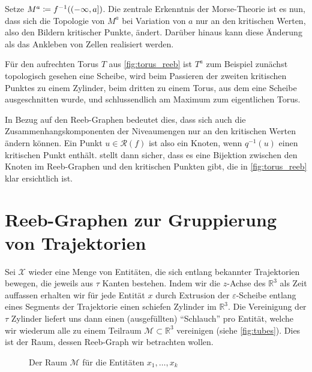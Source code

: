 Setze $M^a \coloneqq f^{-1}\enbrace*{(-\infty,a]}$.
Die zentrale Erkenntnis der Morse-Theorie ist es nun, dass sich die Topologie von $M^a$ bei Variation von $a$ nur an den kritischen Werten, also den Bildern kritischer Punkte, ändert.
Darüber hinaus kann diese Änderung als das Ankleben von Zellen realisiert werden.

Für den aufrechten Torus $T$ aus \cref{fig:torus_reeb} ist $T^a$ zum Beispiel zunächst topologisch gesehen eine Scheibe, wird beim Passieren der zweiten kritischen Punktes zu einem Zylinder, beim dritten zu einem Torus, aus dem eine Scheibe ausgeschnitten wurde, und schlussendlich am Maximum zum eigentlichen Torus.

In Bezug auf den Reeb-Graphen bedeutet dies, dass sich auch die Zusammenhangskomponenten der Niveaumengen nur an den kritischen Werten ändern können.
Ein Punkt $u \in \mathcal{R}(f)$ ist also ein Knoten, wenn $q^{-1}(u)$ einen kritischen Punkt enthält.
 stellt dann sicher, dass es eine Bijektion zwischen den Knoten im Reeb-Graphen und den kritischen Punkten gibt, die in \cref{fig:torus_reeb} klar ersichtlich ist.



\section{Reeb-Graphen zur Gruppierung von Trajektorien} %
\label{sec:trajek_reeb}
Sei $\mathcal{X}$ wieder eine Menge von Entitäten, die sich entlang bekannter Trajektorien bewegen, die jeweils aus $\tau$ Kanten bestehen.
Indem wir die $z$-Achse des $\mathbb{R}^3$ als Zeit auffassen erhalten wir für jede Entität $x$ durch Extrusion der $\varepsilon$-Scheibe entlang eines Segments der Trajektorie einen schiefen Zylinder im $\mathbb{R}^3$.
Die Vereinigung der $\tau$ Zylinder liefert uns dann einen (ausgefüllten) \enquote{Schlauch} pro Entität, welche wir wiederum alle zu einem Teilraum $\mathcal{M} \subset \mathbb{R}^3$ vereinigen (siehe \cref{fig:tubes}).
Dies ist der Raum, dessen Reeb-Graph wir betrachten wollen.

\begin{figure}
	\Centering
	\hspace{1em}
	\label{fig:reeb_graph}
	\caption{Der Raum $\mathcal{M}$ für die Entitäten $x_1, \ldots ,x_k$}
\end{figure}

